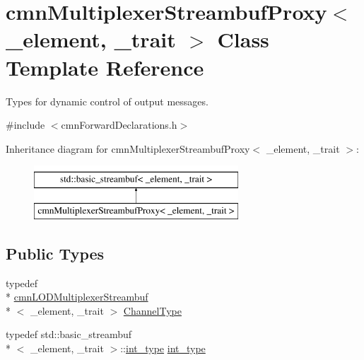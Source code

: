\hypertarget{classcmn_multiplexer_streambuf_proxy}{\section{cmn\-Multiplexer\-Streambuf\-Proxy$<$ \-\_\-element, \-\_\-trait $>$ Class Template Reference}
\label{classcmn_multiplexer_streambuf_proxy}
}


Types for dynamic control of output messages.  




{\ttfamily \#include $<$cmn\-Forward\-Declarations.\-h$>$}

Inheritance diagram for cmn\-Multiplexer\-Streambuf\-Proxy$<$ \-\_\-element, \-\_\-trait $>$\-:\begin{figure}[H]
\begin{center}
\leavevmode
\includegraphics[height=2.000000cm]{da/d9e/classcmn_multiplexer_streambuf_proxy}
\end{center}
\end{figure}
\subsection*{Public Types}
\begin{DoxyCompactItemize}
\item 
typedef \\*
\hyperlink{classcmn_l_o_d_multiplexer_streambuf}{cmn\-L\-O\-D\-Multiplexer\-Streambuf}\\*
$<$ \-\_\-element, \-\_\-trait $>$ \hyperlink{classcmn_multiplexer_streambuf_proxy_aad26781c796870ad583a690f1d4132bb}{Channel\-Type}
\item 
typedef std\-::basic\-\_\-streambuf\\*
$<$ \-\_\-element, \-\_\-trait $>$\-::\hyperlink{classcmn_multiplexer_streambuf_proxy_ac600a28e3e3c860fc54ca7e7931bc6df}{int\-\_\-type} \hyperlink{classcmn_multiplexer_streambuf_proxy_ac600a28e3e3c860fc54ca7e7931bc6df}{int\-\_\-type}
\end{DoxyCompactItemize}
